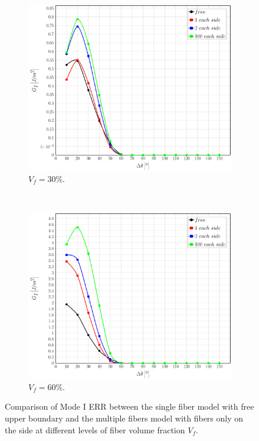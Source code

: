 \documentclass[review]{elsarticle}
\begin{document}
\begin{figure}[!h]
\centering
    \begin{subfigure}[b]{0.475\textwidth}
        \includegraphics[width=\textwidth]{comparefreesidefibers-vf30-GI.pdf}
        \caption{$V_{f}=30\%$.}\label{subfig:comparisonfree30MI}
    \end{subfigure} ~
    \begin{subfigure}[b]{0.475\textwidth}
        \includegraphics[width=\textwidth]{comparefreesidefibers-vf60-GI.pdf}
        \caption{$V_{f}=60\%$.}\label{subfig:comparisonfree60MI}
    \end{subfigure}

\caption{Comparison of Mode I ERR between the single fiber model with free upper boundary and the multiple fibers model with fibers only on the side at different levels of fiber volume fraction $V_{f}$.}\label{fig:comparisonfreeMI}
\end{figure}
\end{document}
